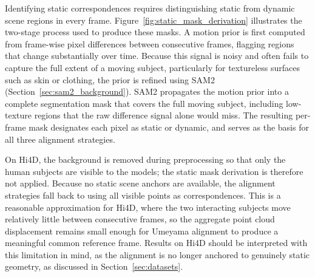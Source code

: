 Identifying static correspondences requires distinguishing static from dynamic scene
regions in every frame. Figure~\ref{fig:static_mask_derivation} illustrates the two-stage
process used to produce these masks. A motion prior is first computed from frame-wise
pixel differences between consecutive frames, flagging regions that change substantially
over time. Because this signal is noisy and often fails to capture the full extent of a
moving subject, particularly for textureless surfaces such as skin or clothing, the prior
is refined using SAM2~\cite{sam2} (Section~\ref{sec:sam2_background}). SAM2 propagates
the motion prior into a complete segmentation mask that covers the full moving subject,
including low-texture regions that the raw difference signal alone would miss. The
resulting per-frame mask designates each pixel as static or dynamic, and serves as the
basis for all three alignment strategies.

On Hi4D, the background is removed during preprocessing so that only the human
subjects are visible to the models; the static mask derivation is therefore not
applied. Because no static scene anchors are available, the alignment strategies
fall back to using all visible points as correspondences. This is a reasonable
approximation for Hi4D, where the two interacting subjects move relatively little
between consecutive frames, so the aggregate point cloud displacement remains
small enough for Umeyama alignment to produce a meaningful common reference frame.
Results on Hi4D should be interpreted with this limitation in mind, as the
alignment is no longer anchored to genuinely static geometry, as discussed in
Section~\ref{sec:datasets}.

